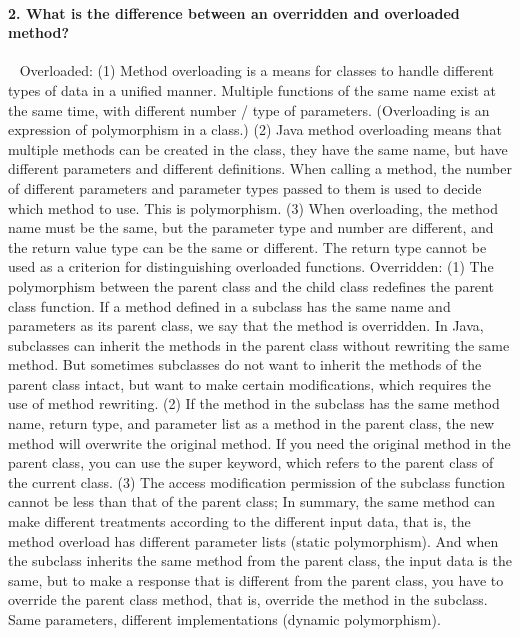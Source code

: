 \documentclass[12pt, leqno]{article}
\begin{document}
\paragraph*{2. What is the difference between an overridden and overloaded method?}~{}
\newline \indent Overloaded:
\newline \indent(1) Method overloading is a means for classes to handle different types of data in a unified manner. Multiple functions of the same name exist at the same time, with different number / type of parameters. (Overloading is an expression of polymorphism in a class.)
\newline \indent(2) Java method overloading means that multiple methods can be created in the class, they have the same name, but have different parameters and different definitions. When calling a method, the number of different parameters and parameter types passed to them is used to decide which method to use. This is polymorphism.
\newline \indent(3) When overloading, the method name must be the same, but the parameter type and number are different, and the return value type can be the same or different. The return type cannot be used as a criterion for distinguishing overloaded functions.
\newline \indent Overridden:
\newline \indent(1) The polymorphism between the parent class and the child class redefines the parent class function. If a method defined in a subclass has the same name and parameters as its parent class, we say that the method is overridden. In Java, subclasses can inherit the methods in the parent class without rewriting the same method. But sometimes subclasses do not want to inherit the methods of the parent class intact, but want to make certain modifications, which requires the use of method rewriting.
\newline \indent(2) If the method in the subclass has the same method name, return type, and parameter list as a method in the parent class, the new method will overwrite the original method. If you need the original method in the parent class, you can use the super keyword, which refers to the parent class of the current class.
\newline \indent(3) The access modification permission of the subclass function cannot be less than that of the parent class;
\newline\newline \indent In summary, the same method can make different treatments according to the different input data, that is, the method overload has different parameter lists (static polymorphism).
\newline \indent And when the subclass inherits the same method from the parent class, the input data is the same, but to make a response that is different from the parent class, you have to override the parent class method, that is, override the method in the subclass. Same parameters, different implementations (dynamic polymorphism).
\end{document}
